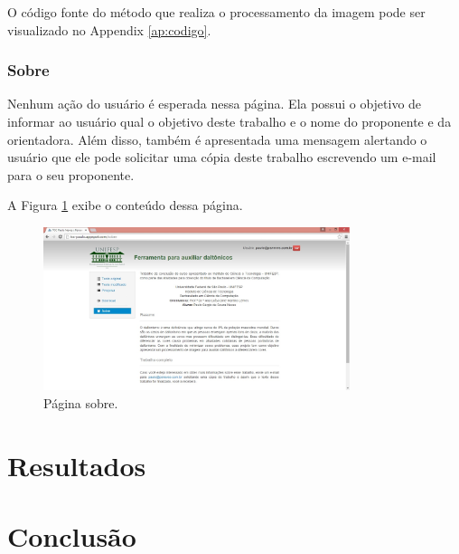 \documentclass[	12pt, Times, openright, twoside, a4paper, english, brazil]{abntex2}
\begin{document}
O código fonte do método que realiza o processamento da imagem pode ser visualizado no Appendix \ref{ap:codigo}.


\subsection{Sobre}

Nenhum ação do usuário é esperada nessa página. Ela possui o objetivo de informar ao usuário qual o objetivo deste trabalho e o nome do proponente e da orientadora. Além disso, também é apresentada uma mensagem alertando o usuário que ele pode solicitar uma cópia deste trabalho escrevendo um e-mail para o seu proponente.

A Figura \ref{fig:figuraSobre} exibe o conteúdo dessa página.

\begin{figure}[!htb]
\centering \includegraphics[width=0.8\textwidth]{telaSobre.jpg}
\caption{Página sobre.} \label{fig:figuraSobre}
\end{figure}

\chapter{Resultados}
\label{cap:resultados}
\chapter{Conclusão}
\postextual


%


%
%
\end{document}
